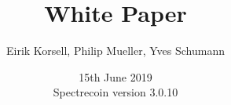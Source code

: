 \author{Eirik Korsell, Philip Mueller, Yves Schumann}
\title{White Paper}
\date{15th June 2019\\
	Spectrecoin version 3.0.10}

\maketitle
